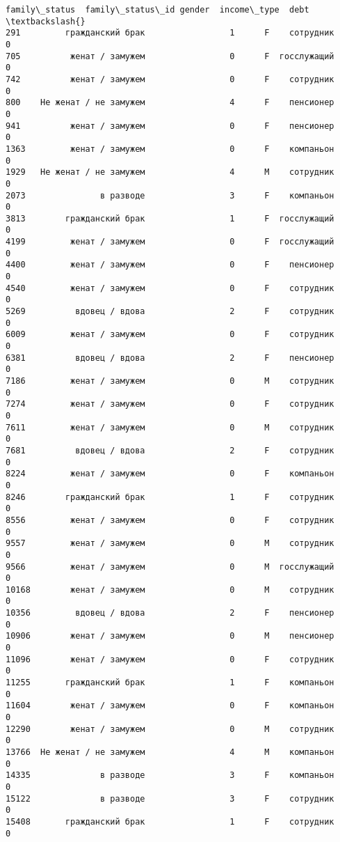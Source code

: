 \documentclass[11pt]{article}
\begin{document}
\begin{Verbatim}[commandchars=\\\{\}]
               family\_status  family\_status\_id gender  income\_type  debt  \textbackslash{}
291         гражданский брак                 1      F    сотрудник     0
705          женат / замужем                 0      F  госслужащий     0
742          женат / замужем                 0      F    сотрудник     0
800    Не женат / не замужем                 4      F    пенсионер     0
941          женат / замужем                 0      F    пенсионер     0
1363         женат / замужем                 0      F    компаньон     0
1929   Не женат / не замужем                 4      M    сотрудник     0
2073               в разводе                 3      F    компаньон     0
3813        гражданский брак                 1      F  госслужащий     0
4199         женат / замужем                 0      F  госслужащий     0
4400         женат / замужем                 0      F    пенсионер     0
4540         женат / замужем                 0      F    сотрудник     0
5269          вдовец / вдова                 2      F    сотрудник     0
6009         женат / замужем                 0      F    сотрудник     0
6381          вдовец / вдова                 2      F    пенсионер     0
7186         женат / замужем                 0      M    сотрудник     0
7274         женат / замужем                 0      F    сотрудник     0
7611         женат / замужем                 0      M    сотрудник     0
7681          вдовец / вдова                 2      F    сотрудник     0
8224         женат / замужем                 0      F    компаньон     0
8246        гражданский брак                 1      F    сотрудник     0
8556         женат / замужем                 0      F    сотрудник     0
9557         женат / замужем                 0      M    сотрудник     0
9566         женат / замужем                 0      M  госслужащий     0
10168        женат / замужем                 0      M    сотрудник     0
10356         вдовец / вдова                 2      F    пенсионер     0
10906        женат / замужем                 0      M    пенсионер     0
11096        женат / замужем                 0      F    сотрудник     0
11255       гражданский брак                 1      F    компаньон     0
11604        женат / замужем                 0      F    компаньон     0
12290        женат / замужем                 0      M    сотрудник     0
13766  Не женат / не замужем                 4      M    компаньон     0
14335              в разводе                 3      F    компаньон     0
15122              в разводе                 3      F    сотрудник     0
15408       гражданский брак                 1      F    сотрудник     0

\end{Verbatim}
\end{document}
